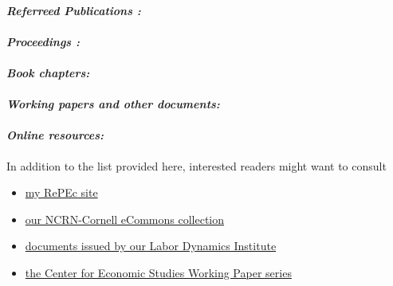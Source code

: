 \documentclass[10pt,letterpaper]{report}
\begin{document}
\paragraph{\it \bf Referreed Publications :}%
\printbibliography[type=article,heading=none]
\paragraph{\it \bf Proceedings :}%
\printbibliography[filter=collective,heading=none]
\paragraph{\it \bf Book chapters:}%
\printbibliography[type=inbook,heading=none]
\paragraph{\it \bf Working papers and other documents:}%
\printbibliography[type=report,heading=none]
\paragraph{\it \bf Online resources:}%
\printbibliography[type=online,heading=none]

In addition to the list provided here, interested readers might want to consult
\begin{itemize}
\item \href{http://ideas.repec.org/e/pvi26.html}{my RePEc site}
\item \href{http://ecommons.library.cornell.edu/handle/1813/30503}{our NCRN-Cornell 
eCommons collection}
\item \href{http://www.ilr.cornell.edu/LDI/documents/index.html}{documents issued by our 
Labor Dynamics Institute}
\item \href{http://ideas.repec.org/s/cen/wpaper.html}{the Center for Economic Studies Working 
Paper series}
\end{itemize}







\end{document}
